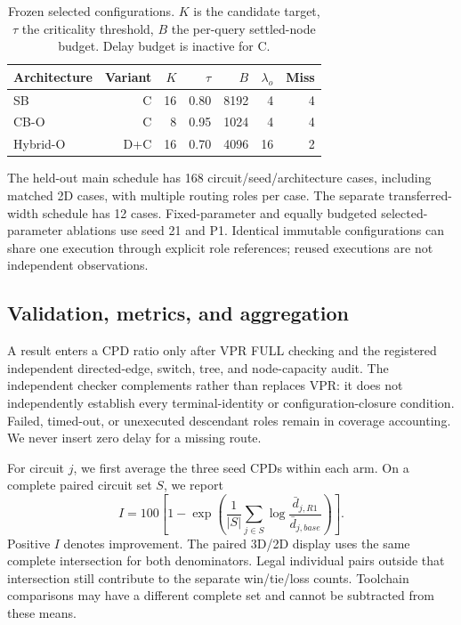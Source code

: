 \documentclass[conference,10pt]{IEEEtran}
\begin{document}
\begin{table}[h]
\centering\caption{Frozen selected configurations. $K$ is the candidate target, $\tau$ the criticality threshold, $B$ the per-query settled-node budget. Delay budget is inactive for C.}
\label{tab:config}
\begin{tabular}{lrrrrrr}\hline
Architecture & Variant & $K$ & $\tau$ & $B$ & $\lambda_o$ & Miss\\\hline
SB & C &16&0.80&8192&4&4\\
CB-O & C &8&0.95&1024&4&4\\
Hybrid-O & D+C &16&0.70&4096&16&2\\\hline
\end{tabular}
\end{table}
The held-out main schedule has 168 circuit/seed/architecture cases, including matched 2D cases, with multiple routing roles per case. The separate transferred-width schedule has 12 cases. Fixed-parameter and equally budgeted selected-parameter ablations use seed 21 and P1. Identical immutable configurations can share one execution through explicit role references; reused executions are not independent observations.

\subsection{Validation, metrics, and aggregation}
A result enters a CPD ratio only after VPR FULL checking and the registered independent directed-edge, switch, tree, and node-capacity audit. The independent checker complements rather than replaces VPR: it does not independently establish every terminal-identity or configuration-closure condition. Failed, timed-out, or unexecuted descendant roles remain in coverage accounting. We never insert zero delay for a missing route.

For circuit $j$, we first average the three seed CPDs within each arm. On a complete paired circuit set $S$, we report
\begin{equation}
 I=100\left[1-\exp\left(\frac{1}{|S|}\sum_{j\in S}\log\frac{\bar d_{j,R1}}{\bar d_{j,base}}\right)\right].
\end{equation}
Positive $I$ denotes improvement. The paired 3D/2D display uses the same complete intersection for both denominators. Legal individual pairs outside that intersection still contribute to the separate win/tie/loss counts. Toolchain comparisons may have a different complete set and cannot be subtracted from these means.
\end{document}
